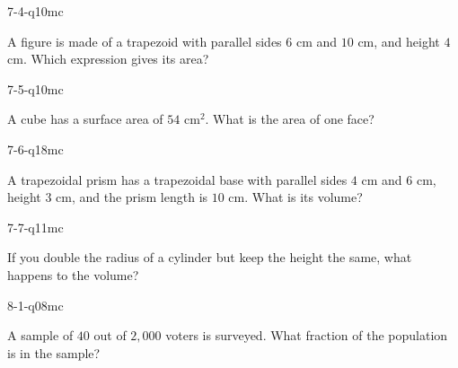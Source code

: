 \begin{practiceQuestion}{7-4-q10}{mc}
\begin{questionText}
A figure is made of a trapezoid with parallel sides $6$ cm and $10$ cm, and height $4$ cm. Which expression gives its area?
\end{questionText}
\end{practiceQuestion}

\begin{practiceQuestion}{7-5-q10}{mc}
\begin{questionText}
A cube has a surface area of $54$ cm$^2$. What is the area of one face?
\end{questionText}
\end{practiceQuestion}

\begin{practiceQuestion}{7-6-q18}{mc}
\begin{questionText}
A trapezoidal prism has a trapezoidal base with parallel sides $4$ cm and $6$ cm, height $3$ cm, and the prism length is $10$ cm. What is its volume?
\end{questionText}
\end{practiceQuestion}

\begin{practiceQuestion}{7-7-q11}{mc}
\begin{questionText}
If you double the radius of a cylinder but keep the height the same, what happens to the volume?
\end{questionText}
\end{practiceQuestion}

\begin{practiceQuestion}{8-1-q08}{mc}
\begin{questionText}
A sample of $40$ out of $2{,}000$ voters is surveyed. What fraction of the population is in the sample?
\end{questionText}
\end{practiceQuestion}


